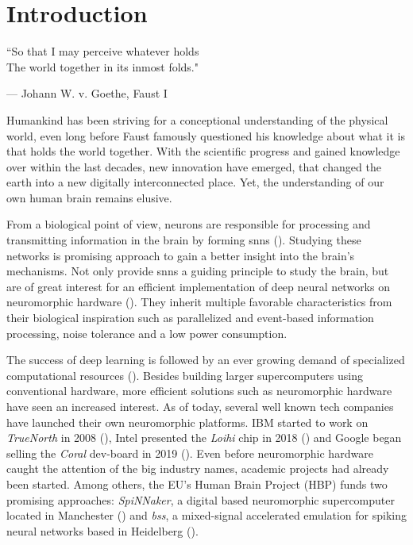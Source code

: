 \chapter{Introduction}

\epigraph{``So that I may perceive whatever holds \\The world together in its inmost folds."}{--- \textup{Johann W. v. Goethe}, Faust I}

Humankind has been striving for a conceptional understanding of the physical world, even long before Faust famously questioned his knowledge about what it is that holds the world together. With the scientific progress and gained knowledge over within the last decades, new innovation have emerged, that changed the earth into a new digitally interconnected place. Yet, the understanding of our own human brain remains elusive.

From a biological point of view, neurons are responsible for processing and transmitting information in the brain by forming \glspl{snn} (\citealp{gerstner2014dynamics}). Studying these networks is promising approach to gain a better insight into the brain's mechanisms. Not only provide \glspl{snn} a guiding principle to study the brain, but are of great interest for an efficient implementation of deep neural networks on neuromorphic hardware (\citealp{pfeiffer2018deep}). They inherit multiple favorable characteristics from their biological inspiration such as parallelized and event-based information processing, noise tolerance and a low power consumption.

The success of deep learning is followed by an ever growing demand of specialized computational resources (\citealp{mayer2020scalable}). Besides building larger supercomputers using conventional hardware, more efficient solutions such as neuromorphic hardware have seen an increased interest. As of today, several well known tech companies have launched their own neuromorphic platforms. IBM started to work on \emph{TrueNorth} in 2008 (\citealp{akopyan2015truenorth}), Intel presented the \emph{Loihi} chip in 2018 (\citealp{davies2018loihi}) and Google began selling the \emph{Coral} dev-board in 2019 (\citealp{cass2019taking}). Even before neuromorphic hardware caught the attention of the big industry names, academic projects had already been started. Among others, the EU's Human Brain Project (HBP) funds two promising approaches: \emph{SpiNNaker}, a digital based neuromorphic supercomputer located in Manchester (\citealp{furber2014spinnaker}) and \emph{\gls{bss}}, a mixed-signal accelerated emulation for spiking neural networks based in Heidelberg (\citealp{brainscales_webpublic}).

